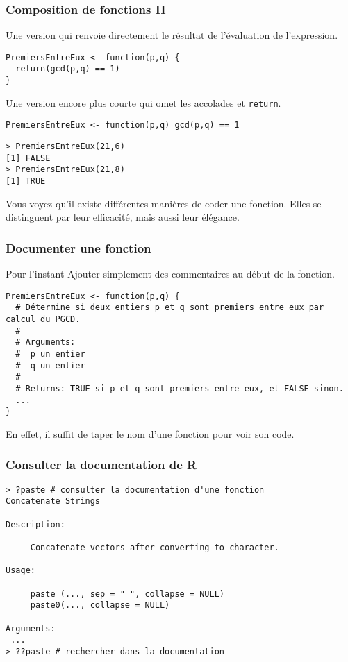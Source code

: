 \documentclass[10pt]{beamer}
\begin{document}
\begin{frame}[fragile]
  \frametitle{Composition de fonctions II}

Une version qui renvoie directement le résultat de l'évaluation de l'expression.
\begin{lstlisting}[style=editor]
PremiersEntreEux <- function(p,q) {
  return(gcd(p,q) == 1)
}
\end{lstlisting}

Une version encore plus courte qui omet les accolades et \texttt{return}.
\begin{lstlisting}[style=editor]
PremiersEntreEux <- function(p,q) gcd(p,q) == 1
\end{lstlisting}

\begin{lstlisting}
> PremiersEntreEux(21,6)
[1] FALSE
> PremiersEntreEux(21,8)
[1] TRUE
\end{lstlisting}

Vous voyez qu'il existe différentes manières de coder une fonction.
Elles se distinguent par leur \alert{efficacité}, mais aussi leur \alert{élégance}.


\end{frame}


\begin{frame}[fragile]
  \frametitle{Documenter une fonction}
  \begin{block}{Pour l'instant}
    Ajouter simplement des commentaires au début de la fonction.
  \end{block}

\begin{lstlisting}
PremiersEntreEux <- function(p,q) {
  # Détermine si deux entiers p et q sont premiers entre eux par calcul du PGCD.
  #
  # Arguments:
  #  p un entier
  #  q un entier
  #
  # Returns: TRUE si p et q sont premiers entre eux, et FALSE sinon.
  ...
}
\end{lstlisting}
En effet, il suffit de \alert{taper le nom d’une fonction pour voir son code}.
\end{frame}

\begin{frame}[fragile]
  \frametitle{Consulter la documentation de R}

  \begin{lstlisting}
> ?paste # consulter la documentation d'une fonction
Concatenate Strings

Description:

     Concatenate vectors after converting to character.

Usage:

     paste (..., sep = " ", collapse = NULL)
     paste0(..., collapse = NULL)

Arguments:
 ...
> ??paste # rechercher dans la documentation
  \end{lstlisting}
\end{frame}
\end{document}

